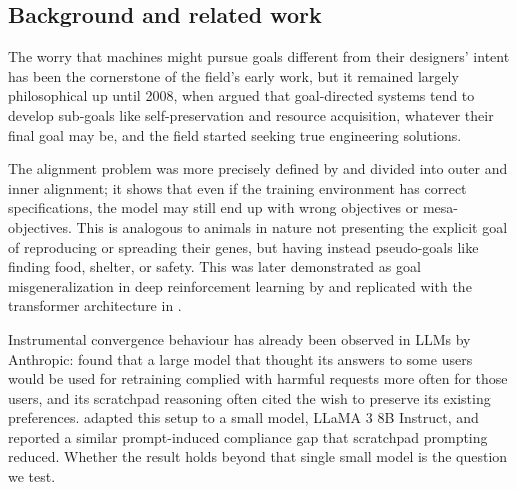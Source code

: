 \begin{toreview}

\section{Background and related work}
\label{sec:related}




The worry that machines might pursue goals different from their designers' intent has been the cornerstone of the field's early work, but it remained largely philosophical up until 2008, when \citet{omohundro2008basic} argued that goal-directed systems tend to develop sub-goals like self-preservation and resource acquisition, whatever their final goal may be, and the field started seeking true engineering solutions.

The alignment problem was more precisely defined by \citet{hubinger2019risks} and divided into outer and inner alignment; it shows that even if the training environment has correct specifications, the model may still end up with wrong objectives or mesa-objectives. This is analogous to animals in nature not presenting the explicit goal of reproducing or spreading their genes, but having instead pseudo-goals like finding food, shelter, or safety. This was later demonstrated as goal misgeneralization in deep reinforcement learning by \citet{langosco2022goal} and replicated with the transformer architecture in \citet{shah2022goal}.

Instrumental convergence behaviour has already been observed in LLMs by Anthropic: \citet{greenblatt_alignment_faking} found that a large model that thought its answers to some users would be used for retraining complied with harmful requests more often for those users, and its scratchpad reasoning often cited the wish to preserve its existing preferences. \citet{koorndijk_empirical_2025} adapted this setup to a small model, LLaMA 3 8B Instruct, and reported a similar prompt-induced compliance gap that scratchpad prompting reduced. Whether the result holds beyond that single small model is the question we test.

\end{toreview}